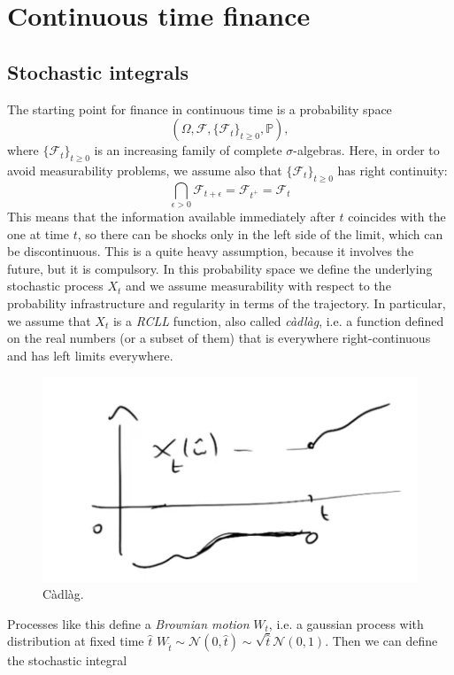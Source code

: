 \chapter{Continuous time finance}
\section{Stochastic integrals}%
The starting point for finance in continuous time is a probability space $$(\Omega,\mathcal{F},\{\mathcal{F}_t\}_{t\ge0},\mathbb{P}),$$ where $\{\mathcal{F}_t\}_{t\ge0}$ is an increasing family of complete $\sigma$-algebras. Here, in order to avoid measurability problems, we assume also that $\{\mathcal{F}_t\}_{t\ge0}$ has right continuity:
\begin{equation*}
    \bigcap_{\epsilon>0}\mathcal{F}_{t+\epsilon}=\mathcal{F}_{t^+} = \mathcal{F}_t
\end{equation*}
This means that the information available immediately after $t$ coincides with the one at time $t$, so there can be shocks only in the left side of the limit, which can be discontinuous. This is a quite heavy assumption, because it involves the future, but it is compulsory. In this probability space we define the underlying stochastic process $X_t$ and we assume measurability with respect to the probability infrastructure and regularity in terms of the trajectory. In particular, we assume that $X_t$ is a \emph{RCLL} function, also called \emph{càdlàg}, i.e. a function defined on the real numbers (or a subset of them) that is everywhere right-continuous and has left limits everywhere.
\begin{figure}[htp]
    \centering
    \includegraphics[scale=0.3]{fig/tmp/fig9.png}
    \caption{Càdlàg.}
    \label{fig:càdlàg}
\end{figure}
Processes like this define a \emph{Brownian motion} $W_t$, i.e. a gaussian process with distribution at fixed time $\hat{t}$ $W_{\hat{t}}\sim\mathcal{N}(0,\hat{t})\sim\sqrt{\hat{t}}\mathcal{N}(0,1)$. Then we can define the stochastic integral
